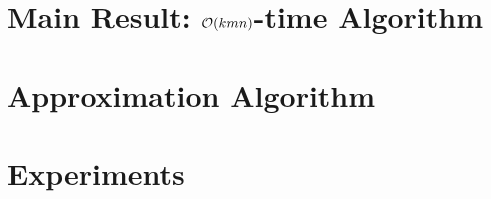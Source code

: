 \section{Main Result: \texorpdfstring{$\mathcal{O}(kmn)$}{Okm}-time Algorithm}
\label{dtw:sec:block}

\section{Approximation Algorithm}
\label{dtw:sec:approx}

\section{Experiments}\label{dtw:sec:experiments}
